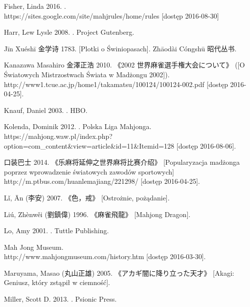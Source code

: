 Fisher, Linda 2016. .
\\https://sites.google.com/site/mahjrules/home/rules [dostęp 2016-08-30]

Harr, Lew Lysle 2008. . Project
Gutenberg.

Jīn Xuéshī 金学诗 1783.  [Plotki o Świniopasach].
Zhāodài Cóngshū 昭代丛书.

Kanazawa Masahiro 金澤正浩 2010.  《2002 世界麻雀選手権大会について》 ([O Światowych Mistrzostwach
Świata w Madżongu 2002]).
\\http://www1.tcue.ac.jp/home1/takamatsu/100124/100124-002.pdf [dostęp
2016-04-25].

Knauf, Daniel 2003. . HBO.

Kolenda, Dominik 2012. . Polska Liga Mahjonga.
\\https://mahjong.waw.pl/index.php?option=com\_content\&view=article\&id=11\&Itemid=128
[dostęp 2016-08-06].

 口装巴士 2014.  《乐麻将延伸之世界麻将比赛介绍》
[Popularyzacja madżonga poprzez wprowadzenie światowych zawodów
sportowych] \\http://m.ptbus.com/huanlemajiang/221298/ [dostęp 2016-04-25].

Lǐ, Ān (李安) 2007. \tytul 《色，戒》 [Ostrożnie, pożądanie].

Liú, Zhènwěi (劉鎮偉) 1996.  《麻雀飛龍》 [Mahjong Dragon].

Lo, Amy 2001. . Tuttle
Publishing.

Mah Jong Museum. 
\\http://www.mahjongmuseum.com/history.htm [dostęp
2016-03-30].

Maruyama, Masao (丸山正雄) 2005.   
  《アカギ闇に降り立った天才》 [Akagi: Geniusz, który zstąpił w
ciemność].

Miller, Scott D. 2013. . Psionic Press.

